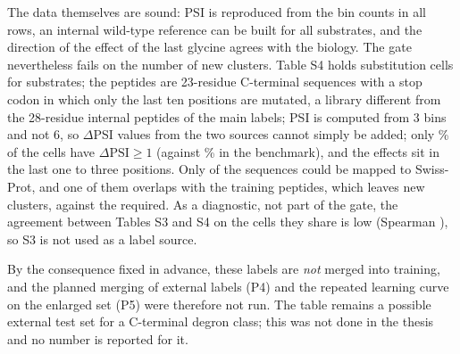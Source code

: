 The data themselves are sound: PSI is reproduced from the bin counts in all rows, an internal wild-type reference can be built for all substrates, and the
direction of the effect of the last glycine agrees with the biology. The gate nevertheless fails on the number of new clusters. Table S4 holds \nKoCells{} substitution cells for \nKoNSubstrates{} substrates;
the peptides are 23-residue C-terminal sequences with a stop codon in which only the last ten positions are mutated, a library different from the 28-residue internal peptides of the main
labels; PSI is computed from 3 bins and not 6, so $\Delta$PSI values from the two sources cannot simply be added; only \nKoPos\% of the cells have $\Delta\mathrm{PSI}\ge1$ (against \nKoZhangPos\% in the benchmark),
and the effects sit in the last one to three positions. Only \nKoMapped{} of the \nKoNSeq{} sequences could be mapped to Swiss-Prot, and one of them overlaps with the training peptides, which leaves
\nKoNewClusters{} new clusters, against the \nKoMinClusters{} required. As a diagnostic, not part of the gate, the agreement between Tables S3 and S4 on the \nKoNOverlap{} cells they share is low (Spearman \nKoSpearman{}), so S3
is not used as a label source.

By the consequence fixed in advance, these labels are \emph{not} merged into training, and the planned merging of external labels (P4) and the repeated learning curve on the enlarged set (P5) were
therefore not run. The table remains a possible external test set for a C-terminal degron class; this was not done in the thesis and no number is reported for it.

